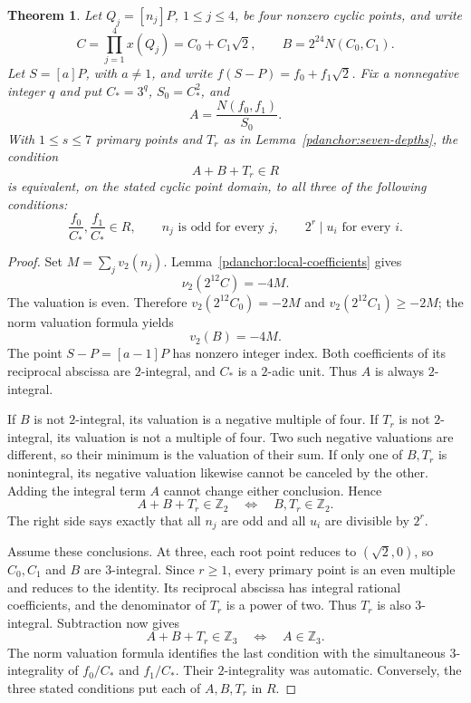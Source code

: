 \documentclass[11pt,a4paper]{article}
\newtheorem{theorem}{Theorem}[section]
\theoremstyle{definition}
\theoremstyle{remark}
\begin{document}
\begin{theorem}\label{pdanchor:merged-depth}
Let $Q_j=[n_j]P$, $1\le j\le4$, be four nonzero cyclic
points, and write
\[
 C=\prod_{j=1}^4x(Q_j)=C_0+C_1\sqrt2,\qquad
 B=2^{24}N(C_0,C_1).
\]
Let $S=[a]P$, with $a\ne1$, and write
$f(S-P)=f_0+f_1\sqrt2$.  Fix a nonnegative integer $q$ and
put $C_*=3^q$, $S_0=C_*^2$, and
\[
                         A=\frac{N(f_0,f_1)}{S_0}.
\]
With $1\le s\le7$ primary points and $T_r$ as in
Lemma~\ref{pdanchor:seven-depths}, the condition
\[
                            A+B+T_r\in R
\]
is equivalent, on the stated cyclic point domain, to all three
of the following conditions:
\[
 \frac{f_0}{C_*},\frac{f_1}{C_*}\in R,
 \qquad n_j\text{ is odd for every }j,
 \qquad 2^r\mid u_i\text{ for every }i.
\]
\end{theorem}
\begin{proof}
Set $M=\sum_jv_2(n_j)$.  Lemma~\ref{pdanchor:local-coefficients}
gives
\[
                  \nu_2(2^{12}C)=-4M.
\]
The valuation is even.  Therefore
$v_2(2^{12}C_0)=-2M$ and
$v_2(2^{12}C_1)\ge-2M$; the norm valuation formula yields
\[
                             v_2(B)=-4M.
\]
The point $S-P=[a-1]P$ has nonzero integer index.  Both
coefficients of its reciprocal abscissa are $2$-integral, and
$C_*$ is a $2$-adic unit.  Thus $A$ is always $2$-integral.

If $B$ is not $2$-integral, its valuation is a negative
multiple of four.  If $T_r$ is not $2$-integral, its valuation
is not a multiple of four.  Two such negative valuations are
different, so their minimum is the valuation of their sum.
If only one of $B,T_r$ is nonintegral, its negative valuation
likewise cannot be canceled by the other.  Adding the integral
term $A$ cannot change either conclusion.  Hence
\[
 A+B+T_r\in\mathbb Z_2
 \quad\Longleftrightarrow\quad
 B,T_r\in\mathbb Z_2.
\]
The right side says exactly that all $n_j$ are odd and all
$u_i$ are divisible by $2^r$.

Assume these conclusions.  At three, each root point reduces
to $(\sqrt2,0)$, so $C_0,C_1$ and $B$ are $3$-integral.
Since $r\ge1$, every primary point is an even multiple and
reduces to the identity.  Its reciprocal abscissa has integral
rational coefficients, and the denominator of $T_r$ is a
power of two.  Thus $T_r$ is also $3$-integral.  Subtraction
now gives
\[
 A+B+T_r\in\mathbb Z_3
       \quad\Longleftrightarrow\quad A\in\mathbb Z_3.
\]
The norm valuation formula identifies the last condition with
the simultaneous $3$-integrality of $f_0/C_*$ and $f_1/C_*$.
Their $2$-integrality was automatic.  Conversely, the three
stated conditions put each of $A,B,T_r$ in $R$.
\end{proof}
\end{document}
